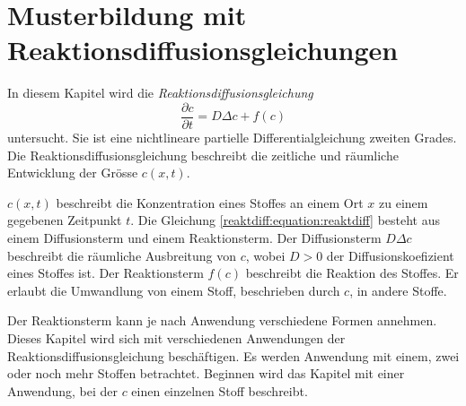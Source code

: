%
%
%
%
\chapter{Musterbildung mit Reaktionsdiffusionsgleichungen\label{chapter:reaktdiff}}
\begin{refsection}

\noindent
In diesem Kapitel wird die \emph{Reaktionsdiffusionsgleichung}
%
\begin{equation}
\label{reaktdiff:equation:reaktdiff}
\frac{\partial c}{\partial t} = D \Delta c + f(c)
\end{equation}
untersucht.
Sie ist eine nichtlineare partielle Differentialgleichung zweiten Grades.
Die Reaktionsdiffusionsgleichung beschreibt die zeitliche und räumliche Entwicklung der Grösse \(c(x,t)\).
%

\(c(x,t)\) beschreibt die Konzentration eines Stoffes an einem Ort \(x\) zu einem gegebenen Zeitpunkt \(t\).
%
Die Gleichung \eqref{reaktdiff:equation:reaktdiff} besteht aus einem Diffusionsterm und einem Reaktionsterm.
Der Diffusionsterm \(D \Delta c\) beschreibt die räumliche Ausbreitung von \(c\), wobei \(D > 0\) der Diffusionskoefizient eines Stoffes ist.
%
%
Der Reaktionsterm \(f(c)\) beschreibt die Reaktion des Stoffes.
%
Er erlaubt die Umwandlung von einem Stoff, beschrieben durch \(c\), in andere Stoffe.

Der Reaktionsterm kann je nach Anwendung verschiedene Formen annehmen.
Dieses Kapitel wird sich mit verschiedenen Anwendungen der Reaktionsdiffusionsgleichung beschäftigen.
Es werden Anwendung mit einem, zwei oder noch mehr Stoffen betrachtet.
Beginnen wird das Kapitel mit einer Anwendung, bei der \(c\) einen einzelnen Stoff beschreibt.







\printbibliography[heading=subbibliography]
\end{refsection}
